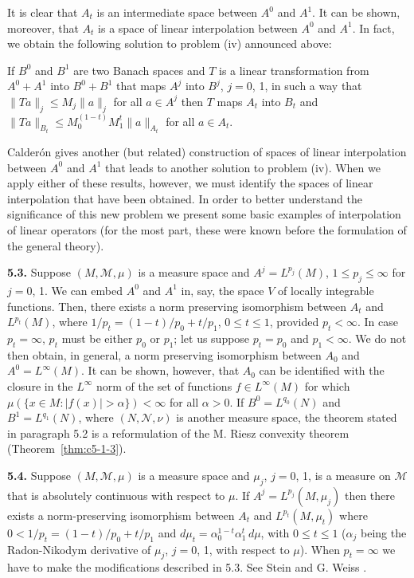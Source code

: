 It is clear that $A_{t}$ is an intermediate space between $A^{0}$ and $A^{1}$.
It can be shown, moreover, that $A_{t}$ is a space of linear interpolation
between $A^{0}$ and $A^{1}$. In fact, we obtain the following solution to
problem (iv) announced above:

If $B^{0}$ and $B^{1}$ are two Banach spaces and $T$ is a linear
transformation from $A^{0} + A^{1}$ into $B^{0} + B^{1}$ that maps $A^{j}$ into
$B^{j}$, $j = 0$, 1, in such a way that $\|Ta\|_{j} \leq M_{j}\|a\|_{j}$ for
all $a \in A^{j}$ then $T$ maps $A_{t}$ into $B_{t}$ and
$\|Ta\|_{B_{t}} \leq M_{0}^{(1-t)}M_{1}^{t}\|a\|_{A_{t}}$ for all
$a \in A_{t}$.

Calder\'on gives another (but related) construction of spaces of linear
interpolation between $A^{0}$ and $A^{1}$ that leads to another solution to
problem (iv). When we apply either of these results, however, we must identify
the spaces of linear interpolation that have been obtained. In order to better
understand the significance of this new problem we present some basic examples
of interpolation of linear operators (for the most part, these were known
before the formulation of the general theory).

\textbf{5.3.} Suppose $(M, \mathcal{M}, \mu)$ is a measure space and
$A^{j} = L^{p_{j}}(M)$, $1 \leq p_{j} \leq \infty$ for $j = 0$, 1. We can
embed $A^{0}$ and $A^{1}$ in, say, the space $V$ of locally integrable
functions. Then, there exists a norm preserving isomorphism between $A_{t}$ and
$L^{p_{t}}(M)$, where $1/p_{t} = (1 - t)/p_{0} + t/p_{1}$, $0 \leq t \leq 1$,
provided $p_{t} < \infty$. In case $p_{t} = \infty$, $p_{t}$ must be either
$p_{0}$ or $p_{1}$; let us suppose $p_{t} = p_{0}$ and $p_{1} < \infty$. We do
not then obtain, in general, a norm preserving isomorphism between $A_{0}$ and
$A^{0} = L^{\infty}(M)$. It can be shown, however, that $A_{0}$ can be
identified with the closure in the $L^{\infty}$ norm of the set of functions
$f \in L^{\infty}(M)$ for which
$\mu(\{x \in M : |f(x)| > \alpha\}) < \infty$ for all $\alpha > 0$. If
$B^{0} = L^{q_{0}}(N)$ and $B^{1} = L^{q_{1}}(N)$, where
$(N, \mathcal{N}, \nu)$ is another measure space, the theorem stated in
paragraph 5.2 is a reformulation of the M. Riesz convexity theorem
(Theorem~\ref{thm:c5-1-3}).

\textbf{5.4.} Suppose $(M, \mathcal{M}, \mu)$ is a measure space and
$\mu_{j}$, $j = 0$, 1, is a measure on $\mathcal{M}$ that is absolutely
continuous with respect to $\mu$. If $A^{j} = L^{p_{j}}(M, \mu_{j})$ then
there exists a norm-preserving isomorphism between $A_{t}$ and
$L^{p_{t}}(M, \mu_{t})$ where
$0 < 1/p_{t} = (1 - t)/p_{0} + t/p_{1}$ and
$d\mu_{t} = \alpha_{0}^{1-t}\alpha_{1}^{t}\,d\mu$, with $0 \leq t \leq 1$
($\alpha_{j}$ being the Radon-Nikodym derivative of $\mu_{j}$, $j = 0$, 1, with
respect to $\mu$). When $p_{t} = \infty$ we have to make the modifications
described in 5.3. See Stein and G. Weiss \cite{SteinWeiss5}.

